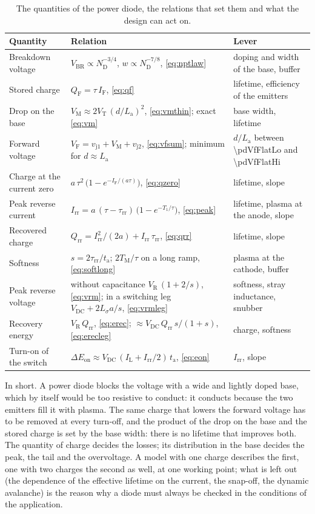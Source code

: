 \documentclass[10pt,a4paper]{scrartcl}
\newcommand{\IF}{I_\mathrm{F}}
\newcommand{\VR}{V_\mathrm{R}}
\newcommand{\VF}{V_\mathrm{F}}
\newcommand{\Irr}{I_\mathrm{rr}}
\newcommand{\Qrr}{Q_\mathrm{rr}}
\newcommand{\ta}{t_\mathrm{a}}
\newcommand{\taurr}{\tau_\mathrm{rr}}
\newcommand{\TM}{T_\mathrm{M}}
\newcommand{\Tone}{T_1}
\newcommand{\vjo}{v_\mathrm{j1}}
\newcommand{\vjt}{v_\mathrm{j2}}
\newcommand{\VT}{V_\mathrm{T}}
\newcommand{\Ls}{L_\sigma}                    %
\newcommand{\ND}{N_\mathrm{D}}
\newcommand{\La}{L_\mathrm{a}}
\newcommand{\VM}{V_\mathrm{M}}
\newcommand{\Vbr}{V_\mathrm{BR}}
\newcommand{\Vdc}{V_\mathrm{DC}}
\newcommand{\QF}{Q_\mathrm{F}}
\begin{document}
\begin{table}[htb]
\centering\small
\caption{The quantities of the power diode, the relations that set them and what the design can act on.}
\label{tab:summary}
\begin{tabular}{@{}l>{\raggedright\arraybackslash}p{6.6cm}>{\raggedright\arraybackslash}p{5.2cm}@{}}
\toprule
Quantity & Relation & Lever \\
\midrule
Breakdown voltage & $\Vbr \propto \ND^{-3/4}$, $w \propto \ND^{-7/8}$, \eqref{eq:nptlaw} & doping and width of the base, buffer \\
Stored charge & $\QF = \tau\,\IF$, \eqref{eq:qf} & lifetime, efficiency of the emitters \\
Drop on the base & $\VM \approx 2\VT\,(d/\La)^2$, \eqref{eq:vmthin}; exact \eqref{eq:vm} & base width, lifetime \\
Forward voltage & $\VF = \vjo + \VM + \vjt$, \eqref{eq:vfsum}; minimum for $d \approx \La$ & $d/\La$ between \num{\pdVfFlatLo} and \num{\pdVfFlatHi} \\
Charge at the current zero & $a\,\tau^2\,\bigl(1-e^{-\IF/(a\tau)}\bigr)$, \eqref{eq:qzero} & lifetime, slope \\
Peak reverse current & $\Irr = a\,(\tau-\taurr)\,\bigl(1-e^{-\Tone/\tau}\bigr)$, \eqref{eq:peak} & lifetime, plasma at the anode, slope \\
Recovered charge & $\Qrr = \Irr^2/(2a) + \Irr\,\taurr$, \eqref{eq:qrr} & lifetime, slope \\
Softness & $s = 2\taurr/\ta$; $2\TM/\tau$ on a long ramp, \eqref{eq:softlong} & plasma at the cathode, buffer \\
Peak reverse voltage & without capacitance $\VR\,(1+2/s)$, \eqref{eq:vrm}; in a switching leg $\Vdc + 2\Ls a/s$, \eqref{eq:vrmleg} & softness, stray inductance, snubber \\
Recovery energy & $\VR\,\Qrr$, \eqref{eq:erec}; $\approx \Vdc\,\Qrr\,s/(1+s)$, \eqref{eq:erecleg} & charge, softness \\
Turn-on of the switch & $\Delta E_\mathrm{on} \approx \Vdc\,(I_\mathrm{L} + \Irr/2)\,\ta$, \eqref{eq:eon} & $\Irr$, slope \\
\bottomrule
\end{tabular}
\end{table}

In short. A power diode blocks the voltage with a wide and lightly doped base, which by itself would be too resistive to conduct: it conducts because the two emitters fill it with plasma. The same charge that lowers the forward voltage has to be removed at every turn-off, and the product of the drop on the base and the stored charge is set by the base width: there is no lifetime that improves both. The quantity of charge decides the losses; its distribution in the base decides the peak, the tail and the overvoltage. A model with one charge describes the first, one with two charges the second as well, at one working point; what is left out (the dependence of the effective lifetime on the current, the snap-off, the dynamic avalanche) is the reason why a diode must always be checked in the conditions of the application.
\appendix
\end{document}
